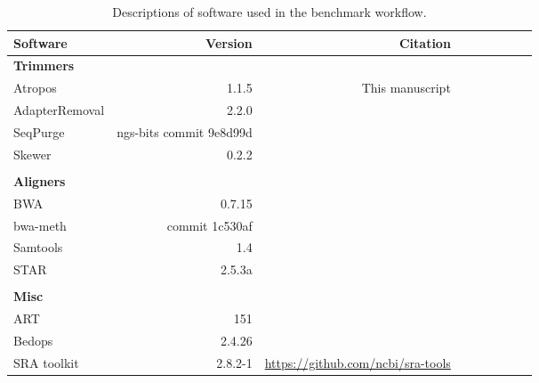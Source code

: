 \begin{table}[ht]
\centering
\begin{tabular}{lrrrrrrrr}
\sisetup{detect-weight=true,detect-inline-weight=math}
    Software & Version & Citation \\\hline
    \textbf{Trimmers} \\
    Atropos & 1.1.5 & This manuscript \\
    AdapterRemoval & 2.2.0 & \cite{schubert_adapterremoval_2016} \\    
    SeqPurge & ngs-bits commit 9e8d99d & \cite{sturm_seqpurge:_2016} \\    
    Skewer & 0.2.2 & \cite{jiang_skewer:_2014} \\ \\
    \textbf{Aligners} \\
    BWA & 0.7.15 & \cite{li_aligning_2013} \\
    bwa-meth & commit 1c530af & \cite{pedersen_fast_2014} \\
    Samtools & 1.4 & \cite{li_sequence_2009} \\
    STAR & 2.5.3a & \cite{dobin_star:_2013} \\ \\
    \textbf{Misc} \\
    ART & 151 & \cite{huang_art:_2012,jiang_skewer:_2014} \\
    Bedops & 2.4.26 & \cite{neph_bedops:_2012} \\
    SRA toolkit & 2.8.2-1 & \url{https://github.com/ncbi/sra-tools}
\end{tabular}
\caption{Descriptions of software used in the benchmark workflow.}\label{containers}
\end{table}
